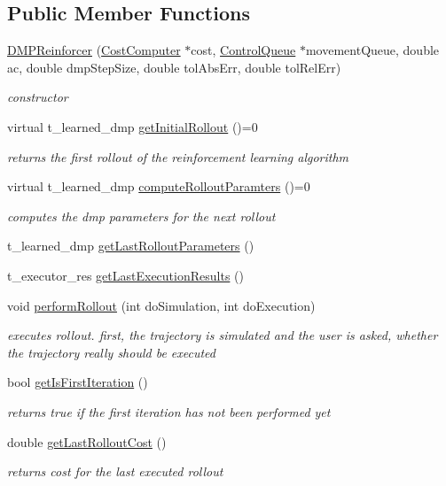 \subsection*{\-Public \-Member \-Functions}
\begin{DoxyCompactItemize}
\item 
\hyperlink{classDMPReinforcer_a3360619f6e4f33d9ed9600165cf1c587}{\-D\-M\-P\-Reinforcer} (\hyperlink{classCostComputer}{\-Cost\-Computer} $\ast$cost, \hyperlink{classControlQueue}{\-Control\-Queue} $\ast$movement\-Queue, double ac, double dmp\-Step\-Size, double tol\-Abs\-Err, double tol\-Rel\-Err)
\begin{DoxyCompactList}\small\item\em constructor \end{DoxyCompactList}\item 
virtual t\-\_\-learned\-\_\-dmp \hyperlink{classDMPReinforcer_aa9459e4d8a500cc6851e19a804680db7}{get\-Initial\-Rollout} ()=0
\begin{DoxyCompactList}\small\item\em returns the first rollout of the reinforcement learning algorithm \end{DoxyCompactList}\item 
virtual t\-\_\-learned\-\_\-dmp \hyperlink{classDMPReinforcer_a0c82b35d96fe07663187b8befd5c1042}{compute\-Rollout\-Paramters} ()=0
\begin{DoxyCompactList}\small\item\em computes the dmp parameters for the next rollout \end{DoxyCompactList}\item 
t\-\_\-learned\-\_\-dmp \hyperlink{classDMPReinforcer_a78c7e984f751de8ec4c0c3f6958c21c9}{get\-Last\-Rollout\-Parameters} ()
\item 
t\-\_\-executor\-\_\-res \hyperlink{classDMPReinforcer_aca3f8c0cdcc83587e46afc60dbda26e6}{get\-Last\-Execution\-Results} ()
\item 
void \hyperlink{classDMPReinforcer_a62083811b2610a623f7d3fe8e7fadeee}{perform\-Rollout} (int do\-Simulation, int do\-Execution)
\begin{DoxyCompactList}\small\item\em executes rollout. first, the trajectory is simulated and the user is asked, whether the trajectory really should be executed \end{DoxyCompactList}\item 
bool \hyperlink{classDMPReinforcer_a3ab981755e30c3feb310e020ab705c3d}{get\-Is\-First\-Iteration} ()
\begin{DoxyCompactList}\small\item\em returns true if the first iteration has not been performed yet \end{DoxyCompactList}\item 
double \hyperlink{classDMPReinforcer_a93dbd9ce2b2de8b527dde3039854ace4}{get\-Last\-Rollout\-Cost} ()
\begin{DoxyCompactList}\small\item\em returns cost for the last executed rollout \end{DoxyCompactList}\end{DoxyCompactItemize}


